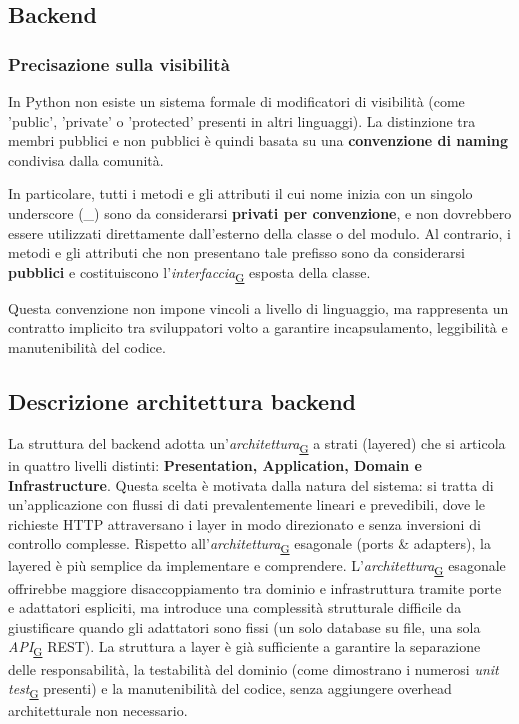 \documentclass[a4paper,12pt]{article}
\begin{document}
        \subsection{Backend}

        
        \subsubsection{Precisazione sulla visibilità}
            In Python non esiste un sistema formale di modificatori di visibilità (come 'public', 'private' o 'protected' presenti in altri linguaggi). La distinzione tra membri pubblici e non pubblici è quindi basata su una \textbf{convenzione di naming} condivisa dalla comunità.

            In particolare, tutti i metodi e gli attributi il cui nome inizia con un singolo underscore (\_) sono da considerarsi \textbf{privati per convenzione}, e non dovrebbero essere utilizzati direttamente dall'esterno della classe o del modulo. Al contrario, i metodi e gli attributi che non presentano tale prefisso sono da considerarsi \textbf{pubblici} e costituiscono l'\textit{interfaccia}\textsubscript{\href{https://atlasteam9.github.io/Atlas/glossario.html\#Interfaccia}{G}} esposta della classe.
            
            Questa convenzione non impone vincoli a livello di linguaggio, ma rappresenta un contratto implicito tra sviluppatori volto a garantire incapsulamento, leggibilità e manutenibilità del codice.
        \subsection{Descrizione architettura backend}
            La struttura del backend adotta un'\textit{architettura}\textsubscript{\href{https://atlasteam9.github.io/Atlas/glossario.html\#Architettura}{G}} a strati (layered) che si articola in quattro livelli distinti: \textbf{Presentation, Application, Domain e Infrastructure}. Questa scelta è motivata dalla natura del sistema: si tratta di un'applicazione con flussi di dati prevalentemente lineari e prevedibili, dove le richieste HTTP attraversano i layer in modo direzionato e senza inversioni di controllo complesse. Rispetto all'\textit{architettura}\textsubscript{\href{https://atlasteam9.github.io/Atlas/glossario.html\#Architettura}{G}} esagonale (ports \& adapters), la layered è più semplice da implementare e comprendere. L'\textit{architettura}\textsubscript{\href{https://atlasteam9.github.io/Atlas/glossario.html\#Architettura}{G}} esagonale offrirebbe maggiore disaccoppiamento tra dominio e infrastruttura tramite porte e adattatori espliciti, ma introduce una complessità strutturale difficile da giustificare quando gli adattatori sono fissi (un solo database su file, una sola \textit{API}\textsubscript{\href{https://atlasteam9.github.io/Atlas/glossario.html\#API}{G}} REST). La struttura a layer è già sufficiente a garantire la separazione delle responsabilità, la testabilità del dominio (come dimostrano i numerosi \textit{unit test}\textsubscript{\href{https://atlasteam9.github.io/Atlas/glossario.html\#Unittest}{G}} presenti) e la manutenibilità del codice, senza aggiungere overhead architetturale non necessario.
\end{document}
